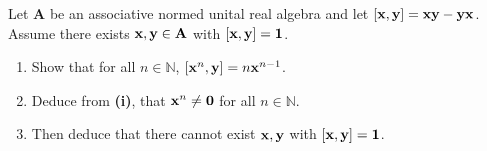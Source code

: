 \begin{exercise}
    Let \( \mathbf{A} \) be an associative normed unital real algebra and let \( \left[ \vb{x}, \vb{y} \right] = \vb{x} \vb{y} - \vb{y} \vb{x}\). Assume there exists \( \vb{x}, \vb{y} \in \mathbf{A} \) with \( \left[ \vb{x}, \vb{y} \right] = \vb{1} \). 
    \begin{enumerate}[label=\textbf{\roman*)}]
        \item Show that for all \( n \in \mathbb{N} \), \( \left[ \vb{x}^{n}, \vb{y} \right] = n \vb{x}^{n-1} \). 
        \item Deduce from \textbf{(i)}, that \( \vb{x}^{n} \neq \vb{0}\) for all \( n \in \mathbb{N} \).
        \item Then deduce that there cannot exist \( \vb{x}, \vb{y} \) with \( \left[ \vb{x}, \vb{y} \right] = \vb{1}\).
    \end{enumerate}
\end{exercise}
